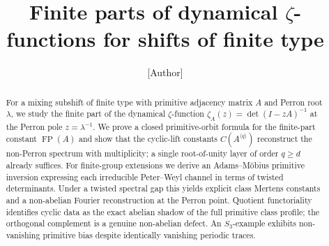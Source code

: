 \documentclass[11pt,a4paper]{amsart}
\title[Finite parts of dynamical $\zeta$-functions]{Finite parts of dynamical $\zeta$-functions for shifts of finite type}
\author{[Author]}
\date{}
\theoremstyle{plain}
\theoremstyle{definition}
\theoremstyle{remark}
\DeclareMathOperator{\FP}{FP}
\begin{document}
\begin{abstract}
For a mixing subshift of finite type with primitive adjacency matrix
\(A\) and Perron root \(\lambda\), we study the finite part of the
dynamical \(\zeta\)-function \(\zeta_A(z)=\det(I-zA)^{-1}\) at the
Perron pole \(z=\lambda^{-1}\). We prove a closed primitive-orbit
formula for the finite-part constant \(\FP(A)\) and show that the
cyclic-lift constants \(C(A^{\langle q\rangle})\) reconstruct the
non-Perron spectrum with multiplicity; a single root-of-unity layer of
order \(q\ge d\) already suffices. For finite-group extensions we
derive an Adams--M\"obius primitive inversion expressing each
irreducible Peter--Weyl channel in terms of twisted determinants.
Under a twisted spectral gap this yields explicit class Mertens
constants and a non-abelian Fourier reconstruction at the Perron
point. Quotient functoriality identifies cyclic data as the exact
abelian shadow of the full primitive class profile; the orthogonal
complement is a genuine non-abelian defect. An \(S_3\)-example
exhibits non-vanishing primitive bias despite identically vanishing
periodic traces.
\end{abstract}


\maketitle







\appendix




\end{document}
